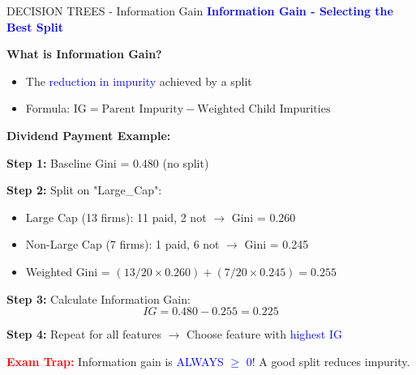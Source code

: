 \documentclass[8pt]{beamer}
\begin{document}
	\begin{frame}{DECISION TREES - Information Gain}
		\fontsize{6.5}{7.5}\selectfont
		\textcolor{blue}{\textbf{Information Gain - Selecting the Best Split}}
		
		\textbf{What is Information Gain?}
		\begin{itemize}
			\item The \textcolor{blue}{reduction in impurity} achieved by a split
			\item Formula: $\text{IG} = \text{Parent Impurity} - \text{Weighted Child Impurities}$
		\end{itemize}
		
		\textbf{Dividend Payment Example:}
		
		\textbf{Step 1:} Baseline Gini = 0.480 (no split)
		
		\textbf{Step 2:} Split on "Large\_Cap":
		\begin{itemize}
			\item Large Cap (13 firms): 11 paid, 2 not $\rightarrow$ Gini = 0.260
			\item Non-Large Cap (7 firms): 1 paid, 6 not $\rightarrow$ Gini = 0.245
			\item Weighted Gini = $(13/20 \times 0.260) + (7/20 \times 0.245) = 0.255$
		\end{itemize}
		
		\textbf{Step 3:} Calculate Information Gain:
		\[
		IG = 0.480 - 0.255 = 0.225
		\]
		
		\textbf{Step 4:} Repeat for all features $\rightarrow$ Choose feature with \textcolor{blue}{highest IG}
		
		\textcolor{red}{\textbf{Exam Trap:}} Information gain is \textcolor{blue}{ALWAYS $\geq$ 0}! A good split reduces impurity.
	\end{frame}
	
\end{document}
